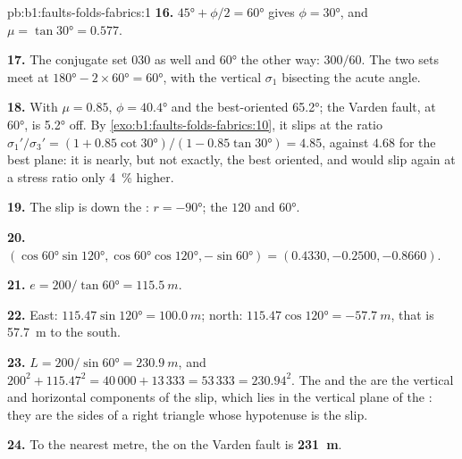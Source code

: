\begin{solution}{pb:b1:faults-folds-fabrics:1}
\textbf{16.} $\ang{45} + \phi/2 = \ang{60}$ gives $\phi = \ang{30}$, and
$\mu = \tan\ang{30} = 0.577$.

\textbf{17.} The conjugate set  $030$ as well and  \ang{60} the other
way: $300/60$. The two sets meet at $\ang{180} - 2\times\ang{60} = \ang{60}$,
with the vertical $\sigma_1$ bisecting the acute angle.

\textbf{18.} With $\mu = 0.85$, $\phi = \ang{40.4}$ and the best-oriented
  \ang{65.2}; the Varden fault, at \ang{60}, is \ang{5.2} off.
By \cref{exo:b1:faults-folds-fabrics:10}, it slips at the ratio
$\sigma_1'/\sigma_3' = (1 + 0.85\cot\ang{30})/(1 - 0.85\tan\ang{30}) = 4.85$,
against $4.68$ for the best plane: it is nearly, but not exactly, the best
oriented, and would slip again at a stress ratio only \qty{4}{\percent}
higher.

\textbf{19.} The slip is down the : $r = \ang{-90}$; the  
$120$ and  \ang{60}.

\textbf{20.} $(\cos\ang{60}\sin\ang{120}, \cos\ang{60}\cos\ang{120},
-\sin\ang{60}) = (0.4330, -0.2500, -0.8660)$.

\textbf{21.} $e = 200/\tan\ang{60} = \qty{115.5}{m}$.

\textbf{22.} East: $115.47\sin\ang{120} = \qty{100.0}{m}$; north:
$115.47\cos\ang{120} = \qty{-57.7}{m}$, that is \qty{57.7}{m} to the south.

\textbf{23.} $L = 200/\sin\ang{60} = \qty{230.9}{m}$, and
$200^2 + 115.47^2 = 40\,000 + 13\,333 = 53\,333 = 230.94^2$. The  and the
 are the vertical and horizontal components of the slip, which lies in
the vertical plane of the : they are the sides of a right triangle whose
hypotenuse is the slip.

\textbf{24.} To the nearest metre, the  on the Varden fault is
\textbf{\qty[text-series-to-math=true]{231}{m}}.
\end{solution}
